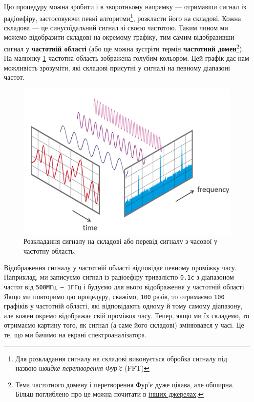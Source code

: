 \documentclass{article}
\begin{document}
Цю процедуру можна зробити і в зворотньому напрямку --- отримавши сигнал із радіоефіру, застосовуючи певні алгоритми\footnote{Для розкладання сигналу на складові виконується обробка сигналу під назвою \textit{швидке перетворення Фур'є} (FFT)}, розкласти його на складові. Кожна складова — це синусоїдальний сигнал зі своєю частотою. Таким чином ми можемо відобразити складові на окремому графіку, тим самим відобразивши сигнал у \textbf{частотній області} (або ще можна зустріти термін \textbf{частотний домен}\footnote{Тема частотного домену і перетворення Фур'є дуже цікава, але обширна. Більш поглиблено про це можна почитати в \href{https://pysdr.org/ukraine/content-ukraine/frequency_domain.html}{інших джерелах}.}). На малюнку \ref{fig:freq-domain} частотна область зображена голубим кольором. Цей графік дає нам можливість зрозуміти, які складові присутні у сигналі на певному діапазоні частот.

\begin{figure}[h!]
\centering
\includegraphics[width=0.7\linewidth]{images/freq-domain.png}
\caption{\label{fig:freq-domain}Розкладання сигналу на складові або перевід сигналу з часової у частотну область.}
\end{figure}

Відображення сигналу у частотній області відповідає певному проміжку часу. Наприклад, ми записуємо сигнал із радіоефіру тривалістю \texttt{0.1c} з діапазоном частот від \texttt{500MГц -- 1ГГц} і будуємо для нього відображення у частотній області. Якщо ми повторимо цю процедуру, скажімо, \texttt{100} разів, то отримаємо \texttt{100} графіків у частотній області, які відповідають одному й тому самому діапазону, але кожен окремо відображає свій проміжок часу. Тепер, якщо ми їх складемо, то отримаємо картину того, як сигнал (а саме його складові) змінювався у часі. Це те, що ми бачимо на екрані спектроаналізатора.
\end{document}
